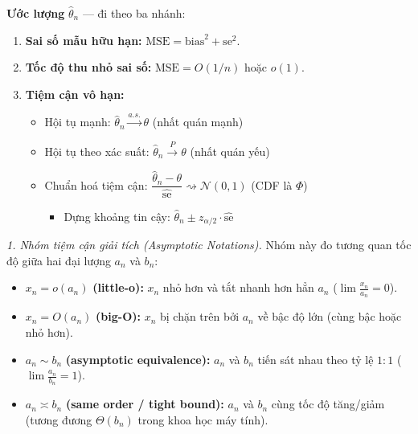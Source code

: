 \begin{tcolorbox}[qnastyle, colback=white, colframe=boxrule]
\textbf{Ước lượng} $\widehat\theta_n$ --- đi theo ba nhánh:
\begin{enumerate}[leftmargin=1.6em]
\item \textbf{Sai số mẫu hữu hạn:} $\mathrm{MSE}=\mathrm{bias}^2+\mathrm{se}^2$.
\item \textbf{Tốc độ thu nhỏ sai số:} $\mathrm{MSE}=O(1/n)$ hoặc $o(1)$.
\item \textbf{Tiệm cận vô hạn:}
  \begin{itemize}[leftmargin=1.4em]
  \item Hội tụ mạnh: $\widehat\theta_n\xrightarrow{a.s.}\theta$ \quad(nhất quán mạnh)
  \item Hội tụ theo xác suất: $\widehat\theta_n\xrightarrow{P}\theta$ \quad(nhất quán yếu)
  \item Chuẩn hoá tiệm cận: $\dfrac{\widehat\theta_n-\theta}{\widehat{\mathrm{se}}}\rightsquigarrow\mathcal{N}(0,1)$ \quad(CDF là $\Phi$)
    \begin{itemize}[leftmargin=1.4em]
    \item[$\hookrightarrow$] Dựng khoảng tin cậy: $\widehat\theta_n\pm z_{\alpha/2}\cdot\widehat{\mathrm{se}}$
    \end{itemize}
  \end{itemize}
\end{enumerate}
\end{tcolorbox}

\textit{1. Nhóm tiệm cận giải tích (Asymptotic Notations).} Nhóm này đo tương quan tốc độ giữa hai đại lượng $a_n$ và $b_n$:
\begin{itemize}
\item $x_n=o(a_n)$ \textbf{(little-o):} $x_n$ nhỏ hơn và tắt nhanh hơn hẳn $a_n$ ($\lim \frac{x_n}{a_n}=0$).
\item $x_n=O(a_n)$ \textbf{(big-O):} $x_n$ bị chặn trên bởi $a_n$ về bậc độ lớn (cùng bậc hoặc nhỏ hơn).
\item $a_n\sim b_n$ \textbf{(asymptotic equivalence):} $a_n$ và $b_n$ tiến sát nhau theo tỷ lệ $1{:}1$ ($\lim\frac{a_n}{b_n}=1$).
\item $a_n\asymp b_n$ \textbf{(same order / tight bound):} $a_n$ và $b_n$ cùng tốc độ tăng/giảm (tương đương $\Theta(b_n)$ trong khoa học máy tính).
\end{itemize}

